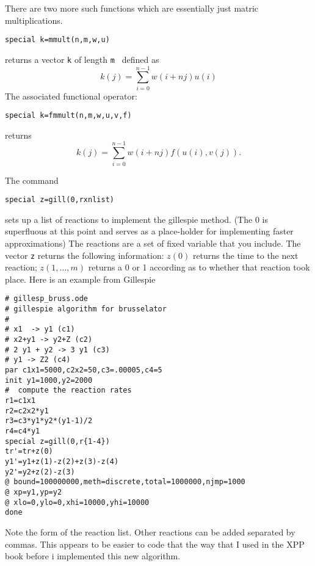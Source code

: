 \documentclass{article}
\newcommand{\tc}[1]{\addcontentsline{toc}{subsection}{#1}}
\begin{document}
There are two more such functions which are essentially just matric
multiplications. 
\begin{verbatim}
special k=mmult(n,m,w,u)
\end{verbatim}
returns a vector {\tt k} of length {\tt m } defined as
\[
k(j)=\sum_{i=0}^{n-1} w(i+nj)u(i)
\]
The associated functional operator:
 \begin{verbatim}
special k=fmmult(n,m,w,u,v,f)
\end{verbatim} 
returns
\[
k(j)=\sum_{i=0}^{n-1} w(i+nj)f(u(i),v(j)).
\]
\tc{Gillespie method} The command
\begin{verbatim}
special z=gill(0,rxnlist)
\end{verbatim}
sets up a list of reactions to implement the gillespie method. (The 0
is superfluous at this point and serves as a place-holder for
implementing faster approximations) The reactions are a set of fixed
variable that you include. The vector {\tt z} returns the following
information: $z(0)$ returns the time to the next reaction;
$z(1,\ldots,m)$ returns a 0 or 1 according as to whether that reaction
took place.  Here is an example from Gillespie
\begin{verbatim}
# gillesp_bruss.ode
# gillespie algorithm for brusselator
#
# x1  -> y1 (c1)
# x2+y1 -> y2+Z (c2)
# 2 y1 + y2 -> 3 y1 (c3)
# y1 -> Z2 (c4)
par c1x1=5000,c2x2=50,c3=.00005,c4=5
init y1=1000,y2=2000
#  compute the reaction rates
r1=c1x1
r2=c2x2*y1
r3=c3*y1*y2*(y1-1)/2
r4=c4*y1
special z=gill(0,r{1-4})
tr'=tr+z(0)
y1'=y1+z(1)-z(2)+z(3)-z(4)
y2'=y2+z(2)-z(3)
@ bound=100000000,meth=discrete,total=1000000,njmp=1000
@ xp=y1,yp=y2
@ xlo=0,ylo=0,xhi=10000,yhi=10000
done
\end{verbatim}
Note the form of the reaction list.
Other reactions can be added separated by commas. This appears to be
easier to code that the way that I used in the XPP book before i
implemented  this new algorithm.
\end{document}
